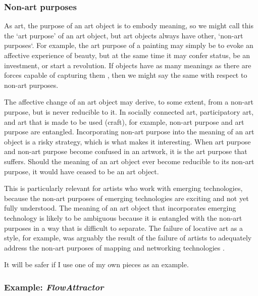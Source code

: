 \documentclass[letterpaper]{article}
\begin{document}
    \subsubsection{Non-art purposes}

    As art, the purpose of an art object is to embody meaning, so we might call this the ‘art purpose’ of an art object, but art objects always have other, ‘non-art purposes‘. For example, the art purpose of a painting may simply be to evoke an affective experience of beauty, but at the same time it may confer status, be an investment, or start a revolution. If objects have as many meanings as there are forces capable of capturing them \citep[p.4]{DeleuzeNtschAndPhlsphy2006}, then we might say the same with respect to non-art purposes.

    The affective change of an art object may derive, to some extent, from a non-art purpose, but is never reducible to it. In socially connected art, participatory art, and art that is made to be used (craft), for example, non-art purpose and art purpose are entangled. Incorporating non-art purpose into the meaning of an art object is a risky strategy, which is what makes it interesting. When art purpose and non-art purpose become confused in an artwork, it is the art purpose that suffers. Should the meaning of an art object ever become reducible to its non-art purpose, it would have ceased to be an art object.
    
    This is particularly relevant for artists who work with emerging technologies, because the non-art purposes of emerging technologies are exciting and not yet fully understood. The meaning of an art object that incorporates emerging technology is likely to be ambiguous because it is entangled with the non-art purposes in a way that is difficult to separate. The failure of locative art as a style, for example, was arguably the result of the failure of artists to adequately address the non-art purposes of mapping and networking technologies \citep{questioningTheFrame2004}.

    It will be safer if I use one of my own pieces as an example.

    \subsubsection{Example: \emph{FlowAttractor}}
\end{document}
